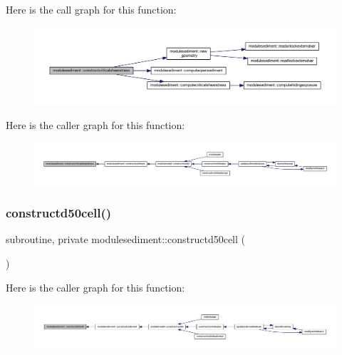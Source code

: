 Here is the call graph for this function\+:\nopagebreak
\begin{figure}[H]
\begin{center}
\leavevmode
\includegraphics[width=350pt]{namespacemodulesediment_a816e46154f7c824c75be6572b099e18a_cgraph}
\end{center}
\end{figure}
Here is the caller graph for this function\+:\nopagebreak
\begin{figure}[H]
\begin{center}
\leavevmode
\includegraphics[width=350pt]{namespacemodulesediment_a816e46154f7c824c75be6572b099e18a_icgraph}
\end{center}
\end{figure}
\mbox{\label{namespacemodulesediment_a595754027fca9b62be67b11dbad30185}} 
\subsubsection{\texorpdfstring{constructd50cell()}{constructd50cell()}}
{\footnotesize\ttfamily subroutine, private modulesediment\+::constructd50cell (\begin{DoxyParamCaption}{ }\end{DoxyParamCaption})\hspace{0.3cm}{\ttfamily [private]}}

Here is the caller graph for this function\+:\nopagebreak
\begin{figure}[H]
\begin{center}
\leavevmode
\includegraphics[width=350pt]{namespacemodulesediment_a595754027fca9b62be67b11dbad30185_icgraph}
\end{center}
\end{figure}
\mbox{\label{namespacemodulesediment_a65ecb7c9b87860dde4303791884a9956}} 
